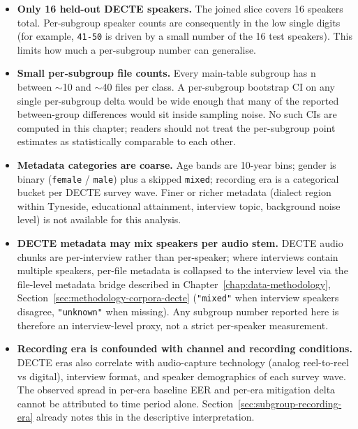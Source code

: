\begin{itemize}
    \item \textbf{Only 16 held-out DECTE speakers.} The joined slice covers 16
        speakers total. Per-subgroup speaker counts are consequently in
        the low single digits (for example, \texttt{41-50} is driven by a
        small number of the 16 test speakers). This limits how much a
        per-subgroup number can generalise.
    \item \textbf{Small per-subgroup file counts.} Every main-table subgroup
        has n between $\sim$10 and $\sim$40 files per class. A per-subgroup
        bootstrap CI on any single per-subgroup delta would be wide
        enough that many of the reported between-group differences
        would sit inside sampling noise. No such CIs are computed in
        this chapter; readers should not treat the per-subgroup point
        estimates as statistically comparable to each other.
    \item \textbf{Metadata categories are coarse.} Age bands are 10-year bins;
        gender is binary (\texttt{female} / \texttt{male}) plus a skipped \texttt{mixed};
        recording era is a categorical bucket per DECTE survey wave.
        Finer or richer metadata (dialect region within Tyneside,
        educational attainment, interview topic, background noise
        level) is not available for this analysis.
    \item \textbf{DECTE metadata may mix speakers per audio stem.} DECTE audio
        chunks are per-interview rather than per-speaker; where
        interviews contain multiple speakers, per-file metadata is
        collapsed to the interview level via the file-level metadata
        bridge described in Chapter~\ref{chap:data-methodology}, Section~\ref{sec:methodology-corpora-decte} (\texttt{"mixed"} when
        interview speakers disagree, \texttt{"unknown"} when missing). Any
        subgroup number reported here is therefore an interview-level
        proxy, not a strict per-speaker measurement.
    \item \textbf{Recording era is confounded with channel and recording
        conditions.} DECTE eras also correlate with audio-capture
        technology (analog reel-to-reel vs digital), interview format,
        and speaker demographics of each survey wave. The observed
        spread in per-era baseline EER and per-era mitigation delta
        cannot be attributed to time period alone. Section~\ref{sec:subgroup-recording-era} already
        notes this in the descriptive interpretation.

\end{itemize}
